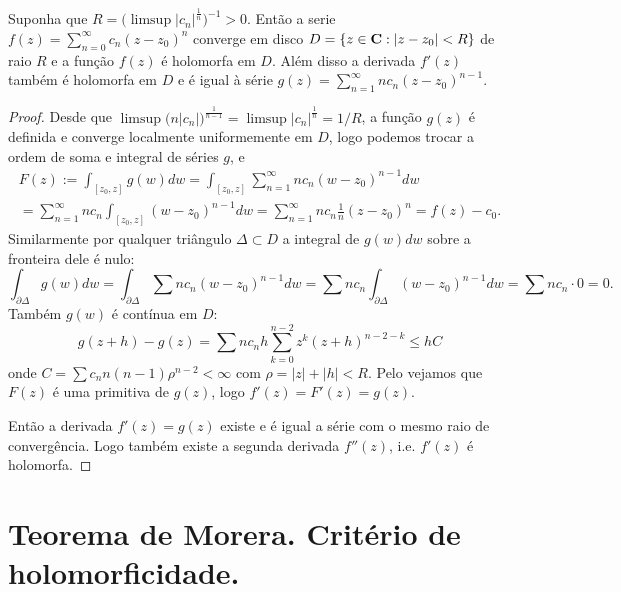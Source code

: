 \begin{teorema}
\label{t:series-derhol}
Suponha que $R = \big(\limsup |c_n|^{\frac1n}\big)^{-1} > 0$. Então a serie
$f(z) = \sum_{n=0}^\infty c_n (z-z_0)^n$ converge em disco
$D = \{z\in\mathbf{C} : |z-z_0|<R\}$ de raio $R$ e a função $f(z)$ é holomorfa em $D$.
Além disso a derivada $f'(z)$ também é holomorfa em $D$
e é igual à série $g(z) = \sum_{n=1}^\infty n c_n (z-z_0)^{n-1}$.
\end{teorema}
\begin{proof}
Desde que $\limsup \big(n|c_n|\big)^{\frac{1}{n-1}} = \limsup |c_n|^{\frac1n} = 1/R$,
a função $g(z)$ é definida e converge localmente uniformemente em $D$,
logo podemos trocar a ordem de soma e integral de séries $g$, e
\begin{multline}
F(z) := \int_{[z_0,z]} g(w) dw
= \int_{[z_0,z]} \sum_{n=1}^\infty n c_n (w-z_0)^{n-1} dw
\\
= \sum_{n=1}^\infty n c_n \int_{[z_0,z]} (w-z_0)^{n-1} dw
= \sum_{n=1}^\infty n c_n \frac1n (z-z_0)^n = f(z) - c_0.
\end{multline}
Similarmente por qualquer triângulo $\Delta \subset D$ a integral de $g(w)dw$ sobre a fronteira dele é nulo:
\[ \int_{\partial \Delta} g(w) dw = \int_{\partial \Delta} \sum n c_n (w-z_0)^{n-1} dw
= \sum n c_n \int_{\partial \Delta} (w-z_0)^{n-1} dw = \sum n c_n \cdot 0 = 0. \]
Também $g(w)$ é contínua em $D$:
\[ g(z+h) - g(z) = \sum n c_n h \sum_{k=0}^{n-2} z^k (z+h)^{n-2-k}
\leq h C \]
onde $C = \sum c_n n (n-1) \rho^{n-2} < \infty$ com $\rho = |z|+|h|<R$.
Pelo  vejamos que $F(z)$ é uma primitiva de $g(z)$,
logo $f'(z) = F'(z) = g(z)$.

Então a derivada $f'(z) = g(z)$ existe e é igual a série com o mesmo raio de convergência.
Logo também existe a segunda derivada $f''(z)$, i.e. $f'(z)$ é holomorfa.
\end{proof}

\section{Teorema de Morera. Critério de holomorficidade.}

